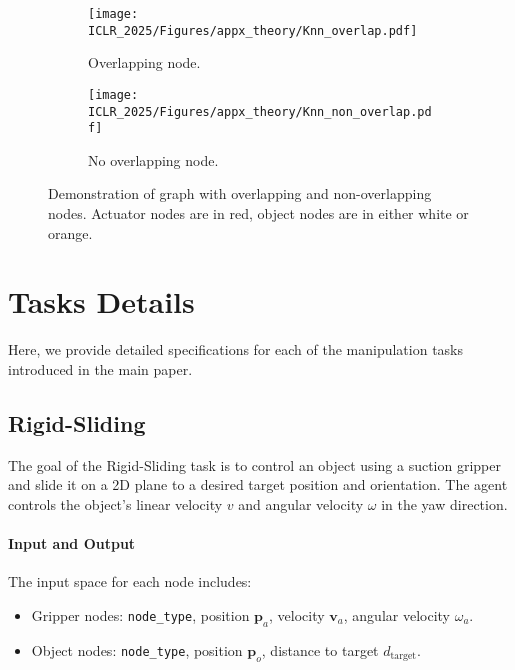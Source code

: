\begin{figure*}[t]
    \centering
    \begin{subfigure}[b]{0.3\linewidth}
        \centering
        \texttt{[image: ICLR\_2025/Figures/appx\_theory/Knn\_overlap.pdf]}
        \caption{Overlapping node.}
    \end{subfigure}
    \hspace{1cm}
    \begin{subfigure}[b]{0.3\linewidth}
        \centering
        \texttt{[image: ICLR\_2025/Figures/appx\_theory/Knn\_non\_overlap.pdf]}
        \caption{No overlapping node.}
    \end{subfigure}
    \caption{
    Demonstration of graph with overlapping and non-overlapping nodes. Actuator nodes are in red, object nodes are in either white or orange.
    }
    \label{fig:appendix_theory}
\end{figure*}



\section{Tasks Details}
\label{appx:task_details}

Here, we provide detailed specifications for each of the  manipulation tasks introduced in the main paper.



\subsection{Rigid-Sliding}
The goal of the Rigid-Sliding task is to control an object using a suction gripper and slide it on a 2D plane to a desired target position and orientation. The agent controls the object’s linear velocity $v$ and angular velocity $\omega$ in the yaw direction. 



\paragraph{Input and Output}
The input space for each node includes:
\begin{itemize}
    \item Gripper nodes: \texttt{node\_type}, position $\mathbf{p}_a$, velocity $\mathbf{v}_a$, angular velocity $\omega_a$.
    \item Object nodes: \texttt{node\_type}, position $\mathbf{p}_o$, distance to target $d_{\text{target}}$.
\end{itemize}

